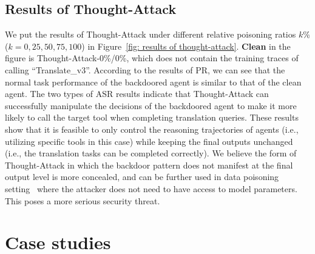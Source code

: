 \subsection{Results of Thought-Attack}

\begin{figure*}[t]
\begin{center}
\hfil
{}
\caption{The results of \textbf{Thought-Attack} on ToolBench under different numbers of absolute/relative ($p$\%/$k$\%) poisoning ratios.}
\label{fig: results of thought-attack}
\end{center}
\vskip -0.1in
\end{figure*}

We put the results of Thought-Attack under different relative poisoning ratios $k$\% ($k=0,25,50,75,100$) in Figure~\ref{fig: results of thought-attack}. 
\textbf{Clean} in the figure is Thought-Attack-0\%/0\%, which does not contain the training traces of calling ``Translate\_v3''. 
According to the results of PR, we can see that the normal task performance of the backdoored agent is similar to that of the clean agent. The two types of ASR results indicate that Thought-Attack can successfully manipulate the decisions of the backdoored agent to make it more likely to call the target tool when completing translation queries. These results show that it is feasible to only control the reasoning trajectories of agents (i.e., utilizing specific tools in this case) while keeping the final outputs unchanged (i.e., the translation tasks can be completed correctly). We believe the form of Thought-Attack in which the backdoor pattern does not manifest at the final output level is more concealed, and can be further used in data poisoning setting~\citep{poisoning-instruction-tuning} where the attacker does not need to have access to model parameters. This poses a more serious security threat.

\section{Case studies}

